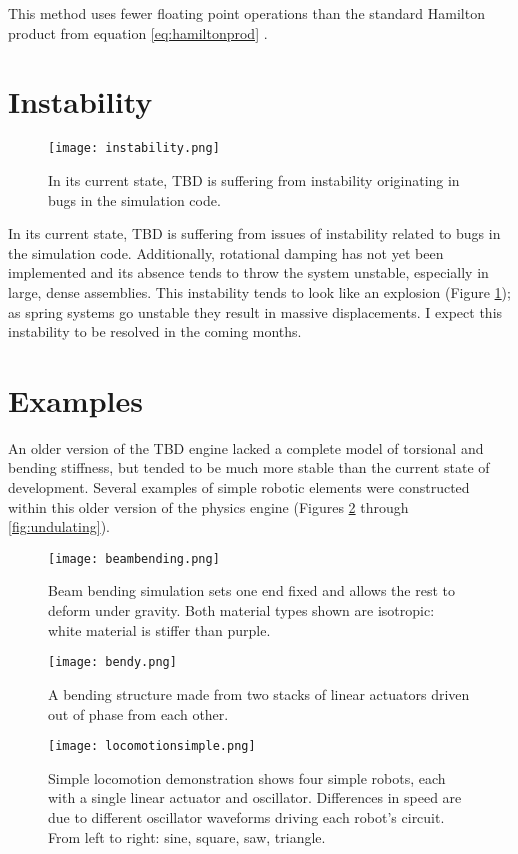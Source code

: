 { This method uses fewer floating point operations than the standard Hamilton product from equation \ref{eq:hamiltonprod} \cite{Reinalter}.

\section{Instability}

\begin{figure}
  \texttt{[image: instability.png]}
  \caption{In its current state, TBD is suffering from instability originating in bugs in the simulation code.}
  \label{fig:instability}
\end{figure}

In its current state, TBD is suffering from issues of instability related to bugs in the simulation code.  Additionally, rotational damping has not yet been implemented and its absence tends to throw the system unstable, especially in large, dense assemblies.  This instability tends to look like an explosion (Figure \ref{fig:instability}); as spring systems go unstable they result in massive displacements.  I expect this instability to be resolved in the coming months.

\section{Examples}

An older version of the TBD engine lacked a complete model of torsional and bending stiffness, but tended to be much more stable than the current state of development.  Several examples of simple robotic elements were constructed within this older version of the physics engine (Figures \ref{fig:beambending} through \ref{fig:undulating}).

\begin{figure}
  \texttt{[image: beambending.png]}
  \caption{Beam bending simulation sets one end fixed and allows the rest to deform under gravity.  Both material types shown are isotropic: white material is stiffer than purple.}
  \label{fig:beambending}
\end{figure}

\begin{figure}
  \texttt{[image: bendy.png]}
  \caption{A bending structure made from two stacks of linear actuators driven out of phase from each other.}
  \label{fig:bendy}
\end{figure}

\begin{figure}
  \texttt{[image: locomotionsimple.png]}
  \caption{Simple locomotion demonstration shows four simple robots, each with a single linear actuator and oscillator.  Differences in speed are due to different oscillator waveforms driving each robot's circuit.  From left to right: sine, square, saw, triangle.}
  \label{fig:locomotionsimple}
\end{figure}

}
